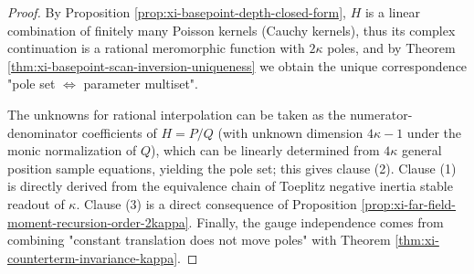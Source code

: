 \begin{proof}
By Proposition \ref{prop:xi-basepoint-depth-closed-form}, \(H\) is a linear combination of finitely many Poisson kernels (Cauchy kernels), thus its complex continuation is a rational meromorphic function with \(2\kappa\) poles, and by Theorem \ref{thm:xi-basepoint-scan-inversion-uniqueness} we obtain the unique correspondence "pole set \(\Longleftrightarrow\) parameter multiset".
\par
The unknowns for rational interpolation can be taken as the numerator-denominator coefficients of \(H=P/Q\) (with unknown dimension \(4\kappa-1\) under the monic normalization of \(Q\)), which can be linearly determined from \(4\kappa\) general position sample equations, yielding the pole set; this gives clause (2).
Clause (1) is directly derived from the equivalence chain of Toeplitz negative inertia stable readout of \(\kappa\).
Clause (3) is a direct consequence of Proposition \ref{prop:xi-far-field-moment-recursion-order-2kappa}.
Finally, the gauge independence comes from combining "constant translation does not move poles" with Theorem \ref{thm:xi-counterterm-invariance-kappa}.
\end{proof}

